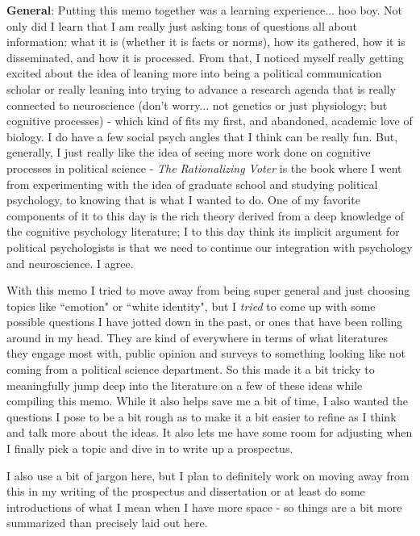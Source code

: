 \documentclass[12pt]{article}
\begin{document}

\doublespacing
{}
\textbf{General}: Putting this memo together was a learning experience... hoo boy. Not only did I learn that I am really just asking tons of questions all about information: what it is (whether it is facts or norms), how its gathered, how it is disseminated, and how it is processed. From that, I noticed myself really getting excited about the idea of leaning more into being a political communication scholar or really leaning into trying to advance a research agenda that is really connected to neuroscience (don't worry... not genetics or just physiology; but cognitive processes) - which kind of fits my first, and abandoned, academic love of biology. I do have a few social psych angles that I think can be really fun. But, generally, I just really like the idea of seeing more work done on cognitive processes in political science - \textit{The Rationalizing Voter} is the book where I went from experimenting with the idea of graduate school and studying political psychology, to knowing that is what I wanted to do. One of my favorite components of it to this day is the rich theory derived from a deep knowledge of the cognitive psychology literature; I to this day think its implicit argument for political psychologists is that we need to continue our integration with psychology and neuroscience. I agree.

With this memo I tried to move away from being super general and just choosing topics like ``emotion" or ``white identity", but I \textit{tried} to come up with some possible questions I have jotted down in the past, or ones that have been rolling around in my head. They are kind of everywhere in terms of what literatures they engage most with, public opinion and surveys to something looking like not coming from a political science department. So this made it a bit tricky to meaningfully jump deep into the literature on a few of these ideas while compiling this memo. While it also helps save me a bit of time, I also wanted the questions I pose to be a bit rough as to make it a bit easier to refine as I think and talk more about the ideas. It also lets me have some room for adjusting when I finally pick a topic and dive in to write up a prospectus.

I also use a bit of jargon here, but I plan to definitely work on moving away from this in my writing of the prospectus and dissertation or at least do some introductions of what I mean when I have more space - so things are a bit more summarized than precisely laid out here.
\end{document}
